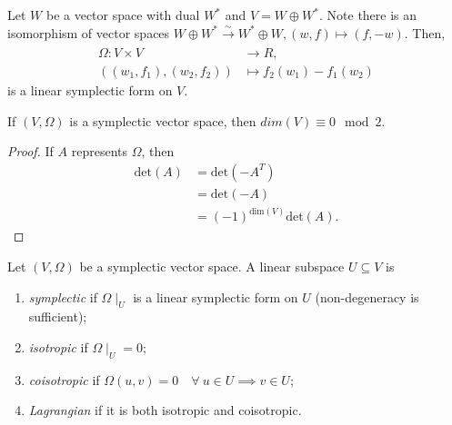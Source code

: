 \documentclass[misc]{subfiles}
\begin{document}
\begin{Exp}
    Let $W$ be a vector space with dual $W^\ast$ and $V=W\oplus W^\ast$. Note there is an isomorphism of vector spaces $W\oplus W^\ast\xrightarrow[]{\sim} W^\ast\oplus W, (w,f)\mapsto (f,-w)$. Then,
    \begin{align*}
        \Omega:V\times V &\to R, \\
        ((w_1,f_1),(w_2,f_2)) &\mapsto f_2(w_1) - f_1(w_2)
    \end{align*}
    is a linear symplectic form on $V$.
\end{Exp}

\begin{Lmm}
    If $(V,\Omega)$ is a symplectic vector space, then ${dim}(V) \equiv 0 \mod 2$.

    \begin{proof}

        If $A$ represents $\Omega$, then
        \begin{align*}
            \text{det}(A) &= \text{det}(-A^T) \\
                          &= \text{det}(-A) \\
                          &= (-1)^{\text{dim}(V)}\text{det}(A).
        \end{align*}
    \end{proof}
\end{Lmm}

\begin{Dfn}\label{Dfn: Symplectic, isotropic, coisotropic and Lagrangian subspaces}
    Let $(V,\Omega)$ be a symplectic vector space. A linear subspace $U\subseteq V$ is
    \begin{enumerate}[label=\DfnLbl]

        \item \emph{symplectic} if $\Omega\mid_U$ is a linear symplectic form on $U$ (non-degeneracy is sufficient);

        \item \emph{isotropic} if $\Omega\mid_U=0$;

        \item \emph{coisotropic} if $\Omega(u,v)=0 \quad \forall \ u\in U \implies v\in U$;

        \item \emph{Lagrangian} if it is both isotropic and coisotropic.
    \end{enumerate}
\end{Dfn}
\end{document}

